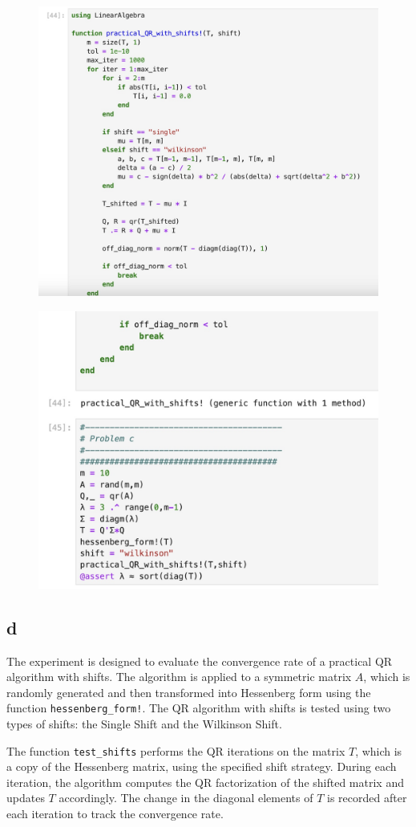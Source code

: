 \documentclass{article}
\begin{document}
\begin{figure}[H]
    \centering
    \includegraphics[width=0.75\linewidth]{Image 4-8-24 at 00.12.jpeg}
\end{figure}
\begin{figure}[H]
    \centering
    \includegraphics[width=0.75\linewidth]{Image 4-8-24 at 00.12 (1).jpeg}
\end{figure}
\subsection{d}
The experiment is designed to evaluate the convergence rate of a practical QR algorithm with shifts. The algorithm is applied to a symmetric matrix $A$, which is randomly generated and then transformed into Hessenberg form using the function \texttt{hessenberg\_form!}. The QR algorithm with shifts is tested using two types of shifts: the Single Shift and the Wilkinson Shift.

The function \texttt{test\_shifts} performs the QR iterations on the matrix $T$, which is a copy of the Hessenberg matrix, using the specified shift strategy. During each iteration, the algorithm computes the QR factorization of the shifted matrix and updates $T$ accordingly. The change in the diagonal elements of $T$ is recorded after each iteration to track the convergence rate.
\end{document}
